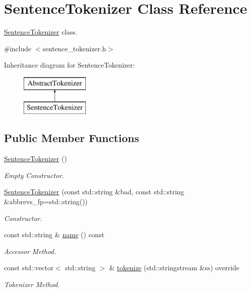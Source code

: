 \hypertarget{class_sentence_tokenizer}{}\section{Sentence\+Tokenizer Class Reference}
\label{class_sentence_tokenizer}


\hyperlink{class_sentence_tokenizer}{Sentence\+Tokenizer} class.  




{\ttfamily \#include $<$sentence\+\_\+tokenizer.\+h$>$}

Inheritance diagram for Sentence\+Tokenizer\+:\begin{figure}[H]
\begin{center}
\leavevmode
\includegraphics[height=2.000000cm]{class_sentence_tokenizer}
\end{center}
\end{figure}
\subsection*{Public Member Functions}
\begin{DoxyCompactItemize}
\item 
\hyperlink{class_sentence_tokenizer_a7ac4c0f31e4066808cb2f4e8f1aee545}{Sentence\+Tokenizer} ()
\begin{DoxyCompactList}\small\item\em Empty Constructor. \end{DoxyCompactList}\item 
\hyperlink{class_sentence_tokenizer_a7788c34102dd503c2df5fd51987dedd8}{Sentence\+Tokenizer} (const std\+::string \&bad, const std\+::string \&abbrevs\+\_\+fp=std\+::string())
\begin{DoxyCompactList}\small\item\em Constructor. \end{DoxyCompactList}\item 
const std\+::string \& \hyperlink{class_sentence_tokenizer_a8779c5491a643a76cc7ce5ded0c28d07}{name} () const
\begin{DoxyCompactList}\small\item\em Accessor Method. \end{DoxyCompactList}\item 
const std\+::vector$<$ std\+::string $>$ \& \hyperlink{class_sentence_tokenizer_a43c1d3f33855c3e5c80cab538cea9224}{tokenize} (std\+::stringstream \&ss) override
\begin{DoxyCompactList}\small\item\em Tokenizer Method. \end{DoxyCompactList}\end{DoxyCompactItemize}
